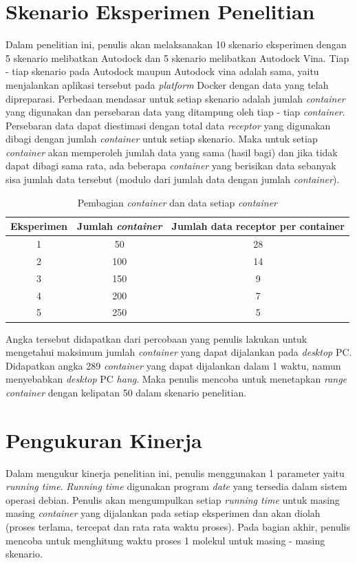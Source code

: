 \section{Skenario Eksperimen Penelitian}
Dalam penelitian ini, penulis akan melaksanakan 10 skenario eksperimen dengan 5 skenario melibatkan Autodock dan 5 skenario melibatkan Autodock Vina. Tiap - tiap skenario pada Autodock maupun Autodock vina adalah sama, yaitu menjalankan aplikasi tersebut pada \textit{platform} Docker dengan data yang telah dipreparasi. Perbedaan mendasar untuk setiap skenario adalah jumlah \textit{container} yang digunakan dan persebaran data yang ditampung oleh tiap - tiap \textit{container}. Persebaran data dapat diestimasi dengan total data \textit{receptor} yang digunakan dibagi dengan jumlah \textit{container} untuk setiap skenario. Maka untuk setiap \textit{container} akan memperoleh jumlah data yang sama (hasil bagi) dan jika tidak dapat dibagi sama rata, ada beberapa \textit{container} yang berisikan data sebanyak sisa jumlah data tersebut (modulo dari jumlah data dengan jumlah \textit{container}).
\begin{table}
	\begin{tabular}{|c|c|c|}
		\hline
		Eksperimen & Jumlah \textit{container} & Jumlah data receptor per container \\ \hline
		1 & 50 & 28 \\ \hline
		2 & 100 & 14 \\ \hline
		3 & 150 & 9 \\ \hline
		4 & 200 & 7 \\ \hline
		5 & 250 & 5 \\ \hline
	\end{tabular}
	\caption{Pembagian \textit{container} dan data setiap \textit{container}}
	\label{my-label}
\end{table}
Angka tersebut didapatkan dari percobaan yang penulis lakukan untuk mengetahui maksimum jumlah \textit{container} yang dapat dijalankan pada \textit{desktop} PC. Didapatkan angka 289 \textit{container} yang dapat dijalankan dalam 1 waktu, namun menyebabkan \textit{desktop} PC \textit{hang}. Maka penulis mencoba untuk menetapkan \textit{range container} dengan kelipatan 50 dalam skenario penelitian. 


\section{Pengukuran Kinerja}
Dalam mengukur kinerja penelitian ini, penulis menggunakan 1 parameter yaitu \textit{running time}. \textit{Running time} digunakan program \textit{date} yang tersedia dalam sistem operasi debian. Penulis akan mengumpulkan setiap \textit{running time} untuk masing masing \textit{container} yang dijalankan pada setiap eksperimen dan akan diolah (proses terlama, tercepat dan rata rata waktu proses). Pada bagian akhir, penulis mencoba untuk menghitung waktu proses 1 molekul untuk masing - masing skenario.





